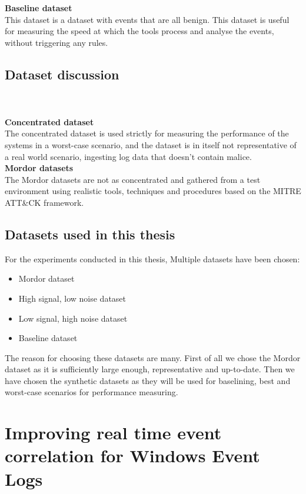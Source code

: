 \textbf{Baseline dataset}\\
This dataset is a dataset with events that are all benign. This dataset is useful for measuring the speed at which the tools process and analyse the events, without triggering any rules.

\subsection{Dataset discussion}
\\
\\
\textbf{Concentrated dataset}\\
The concentrated dataset is used strictly for measuring the performance of the systems in a worst-case scenario, and the dataset is in itself not representative of a real world scenario, ingesting log data that doesn't contain malice.\\
\textbf{Mordor datasets}\\
The Mordor datasets are not as concentrated and gathered from a test environment using realistic tools, techniques and procedures based on the MITRE ATT\&CK framework.

\subsection{Datasets used in this thesis}
\label{sec:datasets-used}

For the experiments conducted in this thesis, Multiple datasets have been chosen:

\begin{itemize}
    \item Mordor dataset
    \item High signal, low noise dataset
    \item Low signal, high noise dataset
    \item Baseline dataset
\end{itemize}
The reason for choosing these datasets are many. First of all we chose the Mordor dataset as it is sufficiently large enough, representative and up-to-date. Then we have chosen the synthetic datasets as they will be used for baselining, best and worst-case scenarios for performance measuring.

\section{Improving real time event correlation for Windows Event Logs}
\label{sec:improving-real-time-event-correlation-for-windows-event-logs}

